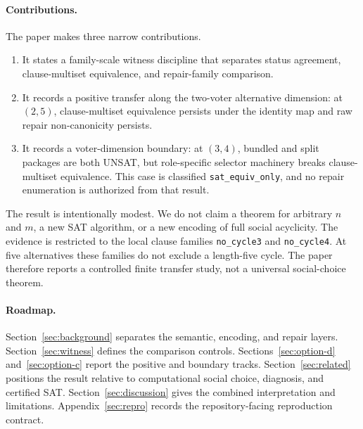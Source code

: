 \paragraph{Contributions.}
The paper makes three narrow contributions.
\begin{enumerate}
  \item It states a family-scale witness discipline that separates status
  agreement, clause-multiset equivalence, and repair-family comparison.
  \item It records a positive transfer along the two-voter alternative
  dimension: at $(2,5)$, clause-multiset equivalence persists under the identity
  map and raw repair non-canonicity persists.
  \item It records a voter-dimension boundary: at $(3,4)$, bundled and split
  packages are both UNSAT, but role-specific selector machinery breaks
  clause-multiset equivalence.  This case is classified
  \texttt{sat\_equiv\_only}, and no repair enumeration is authorized from that
  result.
\end{enumerate}

The result is intentionally modest.  We do not claim a theorem for arbitrary
$n$ and $m$, a new SAT algorithm, or a new encoding of full social acyclicity.
The evidence is restricted to the local clause families
\texttt{no\_cycle3} and \texttt{no\_cycle4}.  At five alternatives these
families do not exclude a length-five cycle.  The paper therefore reports a
controlled finite transfer study, not a universal social-choice theorem.

\paragraph{Roadmap.}
Section~\ref{sec:background} separates the semantic, encoding, and repair
layers.  Section~\ref{sec:witness} defines the comparison controls.
Sections~\ref{sec:option-d} and~\ref{sec:option-c} report the positive and
boundary tracks.  Section~\ref{sec:related} positions the result relative to
computational social choice, diagnosis, and certified SAT\@.
Section~\ref{sec:discussion} gives the combined interpretation and limitations.
Appendix~\ref{sec:repro} records the repository-facing reproduction contract.
